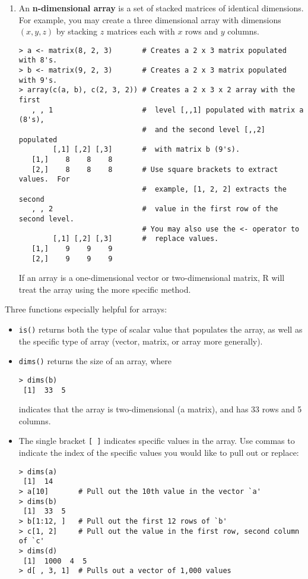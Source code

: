 \begin{enumerate}
\item An \textbf{n-dimensional array} is a set of stacked matrices of identical
  dimensions.  For example, you may create a three dimensional array
  with dimensions $(x, y, z)$ by stacking $z$ matrices each with $x$
  rows and $y$ columns.  
\begin{verbatim}
> a <- matrix(8, 2, 3)       # Creates a 2 x 3 matrix populated with 8's.
> b <- matrix(9, 2, 3)       # Creates a 2 x 3 matrix populated with 9's.
> array(c(a, b), c(2, 3, 2)) # Creates a 2 x 3 x 2 array with the first
   , , 1                     #  level [,,1] populated with matrix a (8's),
                             #  and the second level [,,2] populated 
        [,1] [,2] [,3]       #  with matrix b (9's).  
   [1,]    8    8    8       
   [2,]    8    8    8       # Use square brackets to extract values.  For
                             #  example, [1, 2, 2] extracts the second
   , , 2                     #  value in the first row of the second level.
                             # You may also use the <- operator to 
        [,1] [,2] [,3]       #  replace values.  
   [1,]    9    9    9
   [2,]    9    9    9
\end{verbatim}
If an array is a one-dimensional vector or two-dimensional matrix, R
  will treat the array using the more specific method.  
\end{enumerate}

Three functions especially helpful for
arrays:  
\begin{itemize}
\item {\tt is()} returns both the type of scalar value that populates
the array, as well as the specific type of array (vector, matrix, or
array more generally).
\item {\tt dims()} returns the size of an array, where 
\begin{verbatim}
> dims(b) 
 [1]  33  5
\end{verbatim}
indicates that the array is two-dimensional (a matrix), and has 33
rows and 5 columns.  
\item The single bracket \verb|[ ]| indicates specific values in the
array.  Use commas to indicate the index of the specific values you
would like to pull out or replace:  
\begin{verbatim}
> dims(a)
 [1]  14
> a[10]       # Pull out the 10th value in the vector `a'
> dims(b) 
 [1]  33  5
> b[1:12, ]   # Pull out the first 12 rows of `b' 
> c[1, 2]     # Pull out the value in the first row, second column of `c'
> dims(d)
 [1]  1000  4  5
> d[ , 3, 1]  # Pulls out a vector of 1,000 values 
\end{verbatim}
\end{itemize} 

